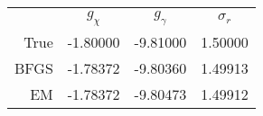 \begin{tabular}{rSSS}
\toprule
&&&\\\otoprule
True&-1.80000&-9.81000&1.50000\\
BFGS&-1.78372&-9.80360&1.49913\\
EM&-1.78372&-9.80473&1.49912\\
\bottomrule\end{tabular}
